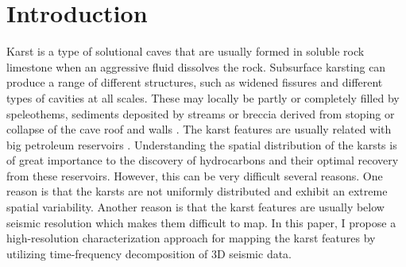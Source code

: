
\section{Introduction} 
Karst is a type of solutional caves that are usually formed in  soluble rock limestone when an aggressive fluid dissolves the rock. Subsurface karsting can produce a range of different structures, such as widened fissures and different types of cavities at all scales.  These may locally be partly or completely filled by
speleothems, sediments deposited by streams or breccia derived from stoping or collapse of the cave roof and walls .  %
The karst features are usually related with big petroleum reservoirs . Understanding the spatial distribution of the karsts is of great importance to the discovery of hydrocarbons and their optimal recovery from these reservoirs. However, this can be very difficult  several reasons. One reason is that the karsts are not uniformly distributed and exhibit an extreme spatial variability. Another reason is that the karst features are usually below seismic resolution\new{,} which makes them difficult to map. In this paper, I propose a high-resolution characterization approach for mapping the karst features by utilizing time-frequency decomposition of 3D seismic data.
 
